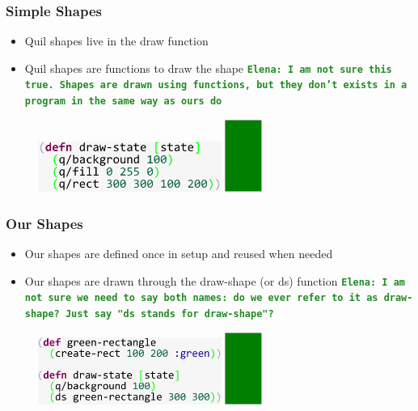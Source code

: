 \documentclass{beamer}
\newcommand{\comment}[1]{{\bf \tt  {#1}}}
\newcommand{\emcomment}[1]{\textcolor{ForestGreen}{\comment{Elena: {#1}}}}
\begin{document}
\begin{frame}
\frametitle{Simple Shapes}
	\begin{itemize}
		\item Quil shapes live in the draw function 
		\item Quil shapes are functions to draw the shape \emcomment{I am not sure this true. Shapes are drawn using functions, but they don't exists in a program in the same way as ours do}
	\end{itemize}
	\begin{figure}
		\includegraphics[width=6cm]{PresentationImages/quilGreenRect.pdf}
		\hspace{1cm}
		\includegraphics[width=1.2cm]{PresentationImages/ourGreenRect.pdf}
	\end{figure}
\end{frame}

\begin{frame}
\frametitle{Our Shapes}
	\begin{itemize}
		\item Our shapes are defined once in setup and reused when needed
		\item Our shapes are drawn through the draw-shape (or ds) function \emcomment{I am not sure we need to say both names: do we ever refer to it as draw-shape? Just say "ds stands for draw-shape"?}
	\end{itemize}
	\begin{figure}
		\includegraphics[width=6cm]{PresentationImages/ourGreenRectCode.pdf}
		\hspace{1cm}
		\includegraphics[width=1.2cm]{PresentationImages/ourGreenRect.pdf}
	\end{figure}
\end{frame}
\end{document}
